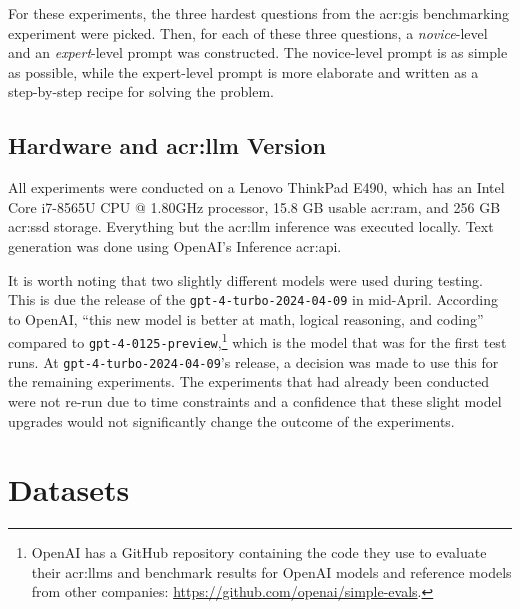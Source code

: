 For these experiments, the three hardest questions from the \acrshort{acr:gis} benchmarking experiment were picked. Then, for each of these three questions, a \textit{novice}-level and an \textit{expert}-level prompt was constructed. The novice-level prompt is as simple as possible, while the expert-level prompt is more elaborate and written as a step-by-step recipe for solving the problem.

\subsection[Hardware and LLM Version]{Hardware and \acrshort{acr:llm} Version}
\label{subsec:hardware-and-model-version}

All experiments were conducted on a Lenovo ThinkPad E490, which has an Intel{\textregistered} Core\texttrademark{} i7-8565U CPU @ 1.80GHz processor, 15.8 GB usable \acrshort{acr:ram}, and 256 GB \acrshort{acr:ssd} storage. Everything but the \acrshort{acr:llm} inference was executed locally. Text generation was done using OpenAI's Inference \acrshort{acr:api}.

It is worth noting that two slightly different models were used during testing. This is due the release of the \texttt{gpt-4-turbo-2024-04-09} in mid-April. According to OpenAI, \enquote{this new model is better at math, logical reasoning, and coding} compared to \texttt{gpt-4-0125-preview},\footnote{OpenAI has a GitHub repository containing the code they use to evaluate their \glspl{acr:llm} and benchmark results for OpenAI models and reference models from other companies: \url{https://github.com/openai/simple-evals}.} which is the model that was for the first test runs. At \texttt{gpt-4-turbo-2024-04-09}'s release, a decision was made to use this for the remaining experiments. The experiments that had already been conducted were not re-run due to time constraints and a confidence that these slight model upgrades would not significantly change the outcome of the experiments.


\section{Datasets}
\label{sec:datasets}

